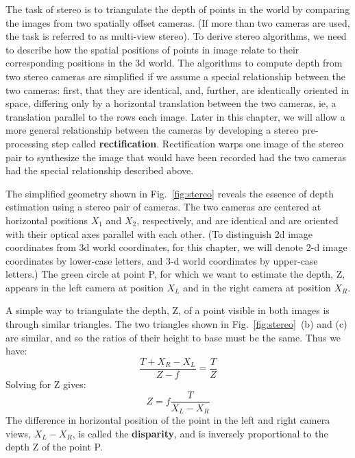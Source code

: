 The task of stereo is to triangulate the depth of points in the world by comparing the images from two spatially offset cameras.  (If more than two cameras are used, the task is referred to as multi-view stereo).  To derive stereo algorithms, we need to describe how the spatial positions of points in image relate to their corresponding positions in the 3d world. 
The algorithms to compute depth from two stereo cameras are  simplified if we assume a special relationship between the two cameras:  first, that they are identical, and, further, are identically oriented in space, differing only by a horizontal translation between the two cameras, ie, a translation parallel to the rows each image.  Later in this chapter, we will allow a more general relationship between the cameras by developing a stereo pre-processing step called {\bf rectification}.  Rectification warps one image of the stereo pair to synthesize the image that would have been recorded had the two cameras had the special relationship described above.


The simplified geometry shown in Fig.~\ref{fig:stereo} reveals the essence of depth estimation using a stereo pair of cameras.  The two cameras are centered  at horizontal positions $X_1$ and $X_2$, respectively, and are identical and are oriented with their optical axes parallel with each other.   (To distinguish 2d image coordinates from 3d world coordinates, for this chapter, we will denote 2-d image coordinates by lower-case letters, and 3-d world coordinates by upper-case letters.) The green circle at point P, for which we want to estimate the depth, Z, appears in the left camera at position $X_L$ and in the right camera at position $X_R$.  

A simple way to triangulate the depth, Z, of a point visible in both images is through similar triangles.  The two triangles shown in  Fig.~\ref{fig:stereo}~(b) and (c) are similar, and so the ratios of their height to base must be the same.  Thus we have:
\begin{equation}
    \frac{T+X_R-X_L}{Z-f} = \frac{T}{Z}
\end{equation}
Solving for Z gives:
\begin{equation}
    Z = f \frac{T}{X_L-X_R}
    \label{eq:depthFromDisparity}
\end{equation}
The difference in horizontal position of the point in the left and right camera views, $X_L - X_R$, is called the {\bf disparity}, and is inversely proportional to the depth Z of the point P.

